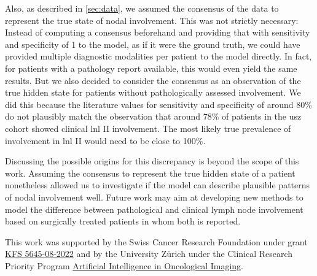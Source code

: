 \documentclass[twocolumn]{aastex631}
\begin{document}
Also, as described in \autoref{sec:data}, we assumed the consensus of the data to represent the true state of nodal involvement. This was not strictly necessary: Instead of computing a consensus beforehand and providing that with sensitivity and specificity of 1 to the model, as if it were the ground truth, we could have provided multiple diagnostic modalities per patient to the model directly. In fact, for patients with a pathology report available, this would even yield the same results. But we also decided to consider the consensus as an observation of the true hidden state for patients without pathologically assessed involvement. We did this because the literature values for sensitivity and specificity of around 80\% do not plausibly match the observation that around 78\% of patients in the \gls{usz} cohort showed clinical \gls{lnl} II involvement. The most likely true prevalence of involvement in \gls{lnl} II would need to be close to 100\%.

Discussing the possible origins for this discrepancy is beyond the scope of this work. Assuming the consensus to represent the true hidden state of a patient nonetheless allowed us to investigate if the model can describe plausible patterns of nodal involvement well. Future work may aim at developing new methods to model the difference between pathological and clinical lymph node involvement based on surgically treated patients in whom both is reported.


\begin{acknowledgments}

This work was supported by the Swiss Cancer Research Foundation under grant \href{https://www.krebsforschung.ch/unterstuetzen-sie-uns/stiftungen/-dl-/fileadmin/downloads/unterstuetzen-sie-uns/projekte-der-stiftung-krebsforschung-schweiz-2023.pdf}{KFS 5645-08-2022} and by the University Zürich under the Clinical Research Priority Program \href{https://www.crpp-ai-oncology.uzh.ch/en/Projects/Project-5.html}{Artificial Intelligence in Oncological Imaging}.

\end{acknowledgments}

\clearpage


\end{document}
